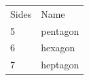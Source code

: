 \begin{table}[H]
{{\begin{center}
\begin{xtabular}[t]{|l|l|}
    
        Sides &
    
    
        Name%
     \tabularnewline{}
    
    
        5 &
    
    
        pentagon%
     \tabularnewline{}
    
    
        6 &
    
    
        hexagon%
     \tabularnewline{}
    
    
        7 &
    
    
        heptagon%
     \tabularnewline{}
    

\end{xtabular}
\end{center}}}
\end{table}
